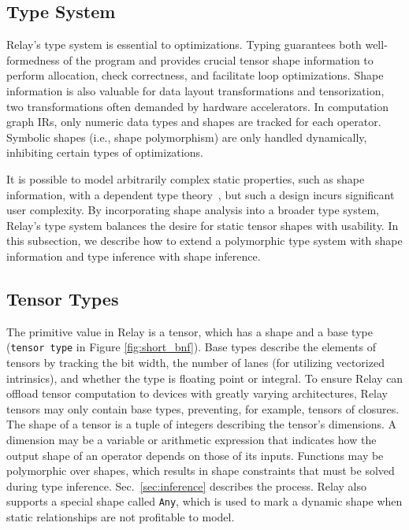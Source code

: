   \subsection{Type System}
  \label{subsec:type_system}

  Relay's type system is essential
    to optimizations.
  Typing guarantees both well-formedness of the program
    and provides crucial tensor shape information to perform allocation,
    check correctness, and facilitate loop optimizations.
  Shape information is also valuable for data layout transformations and tensorization,
    two transformations often demanded by hardware accelerators.
  In computation graph IRs, only numeric data types
    and shapes are tracked for each operator.
  Symbolic shapes (i.e., shape polymorphism) are only handled
    dynamically, inhibiting certain types of optimizations.

  It is possible to model arbitrarily complex static properties, such
    as shape information, with a dependent type theory~\citep{selsam_certigrad}, but such
    a design incurs significant user complexity.
  By incorporating shape analysis into a broader type system,
    Relay's type system balances the desire for static tensor shapes
    with usability.
  In this subsection, we describe how to extend a polymorphic type system with shape
    information and type inference with shape inference.

  \subsection*{Tensor Types}

  The primitive value in Relay is a tensor, which has
    a shape and a base type (\verb|tensor type| in Figure \ref{fig:short_bnf}).
  Base types describe the elements of tensors by tracking
    the bit width,
    the number of lanes (for utilizing vectorized intrinsics),
    and whether the type is floating point or integral.
  To ensure Relay can offload tensor computation to devices
    with greatly varying architectures,
    Relay tensors may only contain base types,
    preventing, for example, tensors of closures.
  The shape of a tensor is a tuple of integers describing the tensor's dimensions.
  A dimension may be a variable or arithmetic expression that indicates how the
    output shape of an operator depends on those of its inputs.
  Functions may be polymorphic over shapes, which results
    in shape constraints that must be solved during type inference.
  Sec.~\ref{sec:inference} describes the process.
  Relay also supports a special shape called \verb|Any|, which is used
    to mark a dynamic shape when static relationships are not profitable
    to model.

